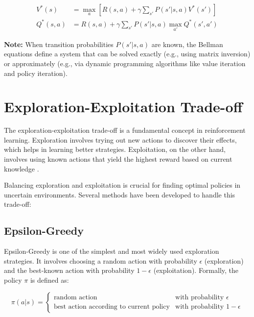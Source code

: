 \documentclass[../Main.tex]{subfiles}
\begin{document}
\begin{align}
    V^*(s) &= \max_a \left[ R(s,a) + \gamma \sum_{s'} P(s'|s,a) V^*(s') \right] \\
    Q^*(s,a) &= R(s,a) + \gamma \sum_{s'} P(s'|s,a) \max_{a'} Q^*(s',a')
\end{align}

\textbf{Note:} When transition probabilities $P(s'|s,a)$ are known, the Bellman equations define a system that can be solved exactly (e.g., using matrix inversion) or approximately (e.g., via dynamic programming algorithms like value iteration and policy iteration).

\section{Exploration-Exploitation Trade-off}

The exploration-exploitation trade-off is a fundamental concept in reinforcement learning. Exploration involves trying out new actions to discover their effects, which helps in learning better strategies. Exploitation, on the other hand, involves using known actions that yield the highest reward based on current knowledge \cite{sutton2018reinforcement}.

Balancing exploration and exploitation is crucial for finding optimal policies in uncertain environments. Several methods have been developed to handle this trade-off:

\subsection{Epsilon-Greedy}

Epsilon-Greedy is one of the simplest and most widely used exploration strategies. It involves choosing a random action with probability \(\epsilon\) (exploration) and the best-known action with probability \(1-\epsilon\) (exploitation). Formally, the policy \(\pi\) is defined as:

\begin{equation}
\pi(a|s) = 
\begin{cases} 
\text{random action} & \text{with probability } \epsilon \\
\text{best action according to current policy} & \text{with probability } 1 - \epsilon 
\end{cases}
\label{eq:26}
\end{equation}
\end{document}
